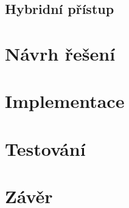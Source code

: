 \section{Hybridní přístup}




\chapter{Návrh řešení}
\label{chapter:navrh_resení}

\chapter{Implementace}
\label{chapter:implementace}

\chapter{Testování}
\label{chapter:testovani}

\chapter{Závěr}
\label{chapter:zaver}





